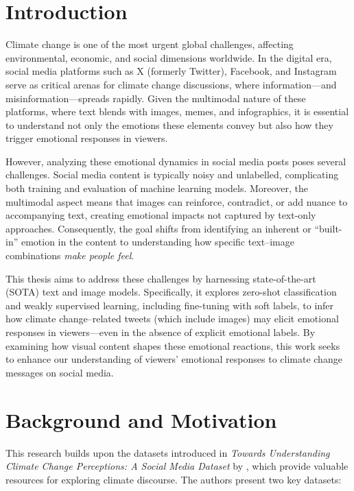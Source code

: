 \section{Introduction}

Climate change is one of the most urgent global challenges, affecting environmental, economic, and social dimensions worldwide. In the digital era, social media platforms such as X (formerly Twitter), Facebook, and Instagram serve as critical arenas for climate change discussions, where information—and misinformation—spreads rapidly. Given the multimodal nature of these platforms, where text blends with images, memes, and infographics, it is essential to understand not only the emotions these elements convey but also how they trigger emotional responses in viewers.
\newline

However, analyzing these emotional dynamics in social media posts poses several challenges. Social media content is typically noisy and unlabelled, complicating both training and evaluation of machine learning models. Moreover, the multimodal aspect means that images can reinforce, contradict, or add nuance to accompanying text, creating emotional impacts not captured by text-only approaches. Consequently, the goal shifts from identifying an inherent or “built-in” emotion in the content to understanding how specific text–image combinations \emph{make people feel}.
\newline

This thesis aims to address these challenges by harnessing state-of-the-art (SOTA) text and image models. Specifically, it explores zero-shot classification and weakly supervised learning, including fine-tuning with soft labels, to infer how climate change–related tweets (which include images) may elicit emotional responses in viewers—even in the absence of explicit emotional labels. By examining how visual content shapes these emotional reactions, this work seeks to enhance our understanding of viewers’ emotional responses to climate change messages on social media.

\section{Background and Motivation}

This research builds upon the datasets introduced in \textit{Towards Understanding Climate Change Perceptions: A Social Media Dataset} by \citet{prasse2023towards}, which provide valuable resources for exploring climate discourse. The authors present two key datasets:

